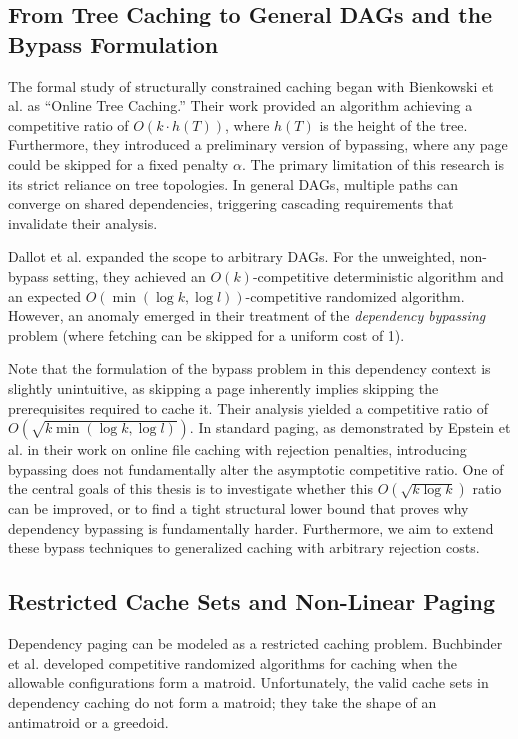 \documentclass[a4paper,11pt]{article}
\begin{document}
\subsection{From Tree Caching to General DAGs and the Bypass Formulation}
The formal study of structurally constrained caching began with Bienkowski et al. \cite{Bienkowskietal2016} as ``Online Tree Caching.'' Their work provided an algorithm achieving a competitive ratio of $O(k \cdot h(T))$, where $h(T)$ is the height of the tree. Furthermore, they introduced a preliminary version of bypassing, where any page could be skipped for a fixed penalty $\alpha$. The primary limitation of this research is its strict reliance on tree topologies. In general DAGs, multiple paths can converge on shared dependencies, triggering cascading requirements that invalidate their analysis.

Dallot et al. \cite{dallot2024dependency} expanded the scope to arbitrary DAGs. For the unweighted, non-bypass setting, they achieved an $O(k)$-competitive deterministic algorithm and an expected $O(\min(\log k, \log l))$-competitive randomized algorithm. However, an anomaly emerged in their treatment of the \textit{dependency bypassing} problem (where fetching can be skipped for a uniform cost of 1). 

Note that the formulation of the bypass problem in this dependency context is slightly unintuitive, as skipping a page inherently implies skipping the prerequisites required to cache it. Their analysis yielded a competitive ratio of $O\left(\sqrt{k \min(\log k, \log l)}\right)$. In standard paging, as demonstrated by Epstein et al. \cite{Epsteinetal2013} in their work on online file caching with rejection penalties, introducing bypassing does not fundamentally alter the asymptotic competitive ratio. One of the central goals of this thesis is to investigate whether this $O(\sqrt{k \log k})$ ratio can be improved, or to find a tight structural lower bound that proves why dependency bypassing is fundamentally harder. Furthermore, we aim to extend these bypass techniques to generalized caching with arbitrary rejection costs.

\subsection{Restricted Cache Sets and Non-Linear Paging}
Dependency paging can be modeled as a restricted caching problem. Buchbinder et al. \cite{buchbinder2014competitive} developed competitive randomized algorithms for caching when the allowable configurations form a matroid. Unfortunately, the valid cache sets in dependency caching do not form a matroid; they take the shape of an antimatroid or a greedoid. 
\end{document}
